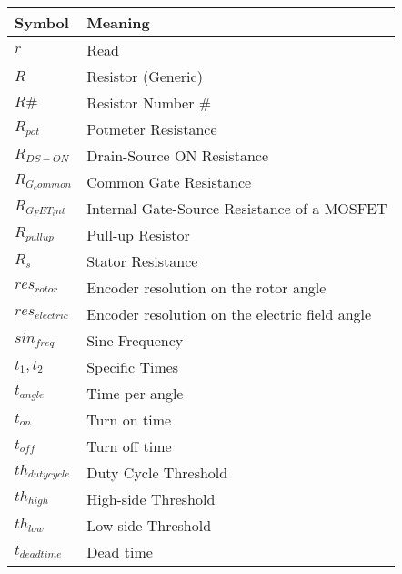 \begin{table}[H]
\centering
\begin{tabular}{|l|l|}
\hline
\textbf{Symbol}      & \textbf{Meaning}                               \\ \hline
$r$                  & Read                                           \\ \hline
$R$                  & Resistor (Generic)                             \\ \hline
$R\#$                & Resistor Number $\#$                           \\ \hline
$R_{pot}$            & Potmeter Resistance                            \\ \hline
$R_{DS-ON}$          & Drain-Source ON Resistance                     \\ \hline
$R_{G_common}$       & Common Gate Resistance                         \\ \hline
$R_{G_FET_int}$      & Internal Gate-Source Resistance of a MOSFET    \\ \hline
$R_{pullup}$         & Pull-up Resistor                               \\ \hline
$R_s$                & Stator Resistance                              \\ \hline
$res_{rotor}$        & Encoder resolution on the rotor angle          \\ \hline
$res_{electric}$     & Encoder resolution on the electric field angle \\ \hline
$sin_{freq}$         & Sine Frequency                                 \\ \hline
$t_1, t_2$           & Specific Times                                 \\ \hline
$t_{angle}$          & Time per angle                                 \\ \hline
$t_{on}$             & Turn on time                                   \\ \hline
$t_{off}$            & Turn off time                                  \\ \hline
$th_{duty cycle}$    & Duty Cycle Threshold                           \\ \hline
$th_{high}$          & High-side Threshold                            \\ \hline
$th_{low}$           & Low-side Threshold                             \\ \hline
$t_{dead time}$      & Dead time                                      \\ \hline

\end{tabular}
\end{table}
